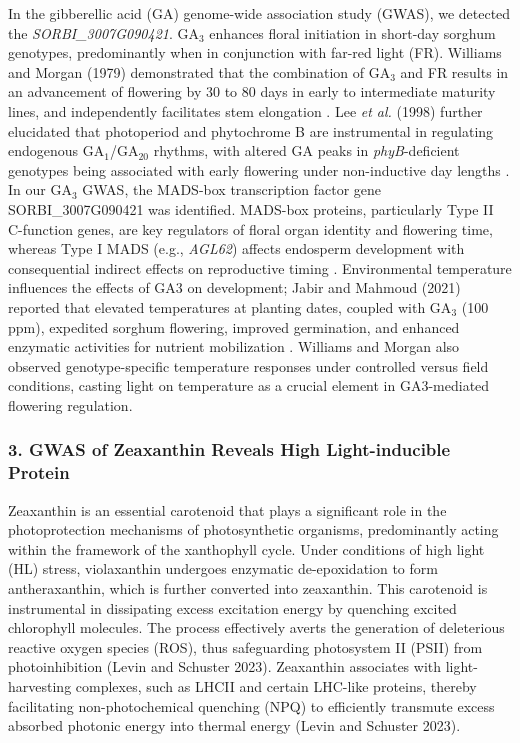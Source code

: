 \documentclass[10pt,letterpaper]{article}
\begin{document}
In the gibberellic acid (GA) genome-wide association study (GWAS), we detected the \textit{SORBI\_3007G090421}. GA\(_3\) enhances floral initiation in short-day sorghum genotypes, predominantly when in conjunction with far-red light (FR). Williams and Morgan (1979) demonstrated that the combination of GA\(_3\) and FR results in an advancement of flowering by 30 to 80 days in early to intermediate maturity lines, and independently facilitates stem elongation \citep{Williams1979}. Lee \emph{et al.} (1998) further elucidated that photoperiod and phytochrome B are instrumental in regulating endogenous GA\(_1\)/GA\(_{20}\) rhythms, with altered GA peaks in \emph{phyB}-deficient genotypes being associated with early flowering under non-inductive day lengths \citep{Lee1998}. In our GA\(_3\) GWAS, the MADS-box transcription factor gene SORBI\_3007G090421 was identified. MADS-box proteins, particularly Type II C-function genes, are key regulators of floral organ identity and flowering time, whereas Type I MADS (e.g., \emph{AGL62}) affects endosperm development with consequential indirect effects on reproductive timing \citep{Paul2020}. Environmental temperature influences the effects of GA3 on development; Jabir and Mahmoud (2021) reported that elevated temperatures at planting dates, coupled with GA\(_3\) (100 ppm), expedited sorghum flowering, improved germination, and enhanced enzymatic activities for nutrient mobilization \citep{Jabir2021}. Williams and Morgan also observed genotype-specific temperature responses under controlled versus field conditions, casting light on temperature as a crucial element in GA3-mediated flowering regulation.


\subsubsection*{3. GWAS of Zeaxanthin Reveals High Light-inducible Protein}

Zeaxanthin is an essential carotenoid that plays a significant role in the photoprotection mechanisms of photosynthetic organisms, predominantly acting within the framework of the xanthophyll cycle. Under conditions of high light (HL) stress, violaxanthin undergoes enzymatic de-epoxidation to form antheraxanthin, which is further converted into zeaxanthin. This carotenoid is instrumental in dissipating excess excitation energy by quenching excited chlorophyll molecules. The process effectively averts the generation of deleterious reactive oxygen species (ROS), thus safeguarding photosystem II (PSII) from photoinhibition (Levin and Schuster 2023). Zeaxanthin associates with light-harvesting complexes, such as LHCII and certain LHC-like proteins, thereby facilitating non-photochemical quenching (NPQ) to efficiently transmute excess absorbed photonic energy into thermal energy (Levin and Schuster 2023).
\end{document}
